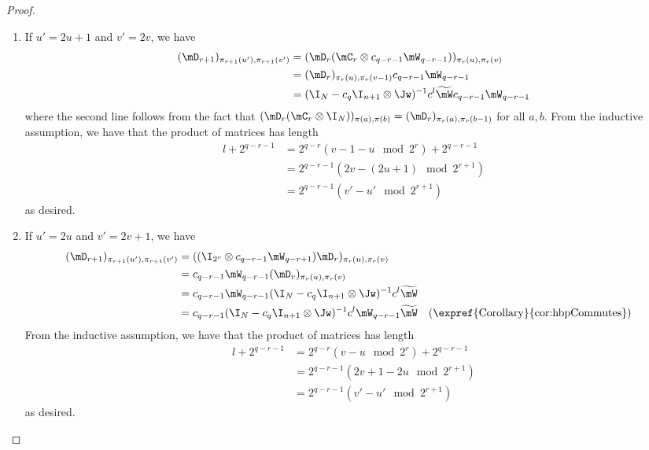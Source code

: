 \documentclass{toc}
\begin{document}
\begin{proof}
\begin{enumerate}
    \item If $u'=2u+1$ and $v'=2v$, we have
    \begin{align*}
        (\mD_{r+1})_{\pi_{r+1}(u'),\pi_{r+1}(v')} &=  (\mD_{r}(\mC_{r} \otimes c_{q-r-1}\mW_{q-r-1}))_{\pi_r(u),\pi_r(v)}\\
        &= (\mD_{r})_{\pi_r(u),\pi_r(v-1)}c_{q-r-1}\mW_{q-r-1}\\
        &= (\I_N-c_q\I_{n+1}\otimes\Jw)^{-1}c^{l}\widetilde{\mW}c_{q-r-1}\mW_{q-r-1}
    \end{align*}
    where the second line follows from the fact that $(\mD_{r}(\mC_r\otimes \I_N))_{\pi(a),\pi(b)}=(\mD_{r})_{\pi_r(a),\pi_r(b-1)}$ for all $a,b$. From the inductive assumption, we have that the product of matrices has length 
    \begin{align*}
        l+2^{q-r-1} &=2^{q-r}(v-1-u \mod 2^{r})+2^{q-r-1}\\
        &=2^{q-r-1}(2v-(2u+1) \mod 2^{r+1})\\
        &= 2^{q-r-1}(v'-u' \mod 2^{r+1})
    \end{align*} 
    as desired.
    
    \item If $u'=2u$ and $v'=2v+1$, we have
    \begin{align*}
        (\mD_{r+1})_{\pi_{r+1}(u'),\pi_{r+1}(v')} &= ((\I_{2^r}\otimes c_{q-r-1}\mW_{q-r+1})\mD_{r})_{\pi_r(u),\pi_r(v)}\\ 
        &= c_{q-r-1}\mW_{q-r-1}(\mD_{r})_{\pi_r(u),\pi_r(v)}\\
        &=c_{q-r-1}\mW_{q-r-1}(\I_N-c_q\I_{n+1}\otimes\Jw)^{-1}c^{l}\widetilde{\mW}\\
        &= c_{q-r-1}(\I_N-c_q\I_{n+1}\otimes\Jw)^{-1}c^{l}\mW_{q-r-1}\widetilde{\mW} && (\text{\expref{Corollary}{cor:hbpCommutes}})
    \end{align*}
    From the inductive assumption, we have that the product of matrices has length
    \begin{align*}
        l+2^{q-r-1} &= 2^{q-r}(v-u \mod 2^{r})+2^{q-r-1}\\
        &=2^{q-r-1}(2v+1-2u \mod 2^{r+1})\\
        &=2^{q-r-1}(v'-u' \mod 2^{r+1})
    \end{align*} 
    as desired.
    

\end{enumerate}
\end{proof}
\end{document}
